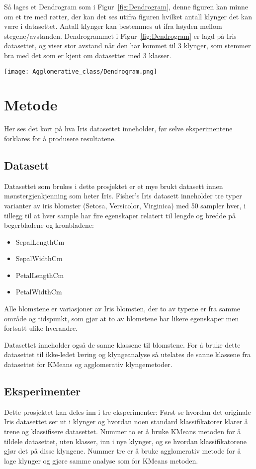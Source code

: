 \documentclass[twocolumn,norwegian]{article}
\begin{document}
	Så lages et Dendrogram som i Figur~\ref{fig:Dendrogram}, denne figuren kan minne om et tre med røtter, der kan det ses utifra figuren hvilket antall klynger det kan være i datasettet. Antall klynger kan bestemmes ut ifra høyden mellom stegene/avstanden. Dendrogrammet i Figur~\ref{fig:Dendrogram} er lagd på Iris datasettet, og viser stor avstand når den har kommet til 3 klynger, som stemmer bra med det som er kjent om datasettet med 3 klasser.
	\begin{figure*}[t!]
		\centering
		\texttt{[image: Agglomerative\_class/Dendrogram.png]}
		\caption{Dendrogam lagd på Iris datasettet for å finne optimalt antall klynger.}
		\label{fig:Dendrogram}
	\end{figure*}
	
	
	\section{Metode}
	Her ses det kort på hva Iris datasettet inneholder, før selve eksperimentene forklares for å produsere resultatene.
	
	\subsection{Datasett}
	Datasettet som brukes i dette prosjektet er et mye brukt datasett innen mønstergjenkjenning som heter Iris. Fisher's Iris datasett inneholder tre typer varianter av iris blomster (Setosa, Versicolor, Virginica) med 50 sampler hver, i tillegg til at hver sample har fire egenskaper relatert til lengde og bredde på begerbladene og kronbladene:
	\begin{itemize}
		\item SepalLengthCm
		\item SepalWidthCm
		\item PetalLengthCm
		\item PetalWidthCm
	\end{itemize}
	Alle blomstene er variasjoner av Iris blomsten, der to av typene er fra samme område og tidspunkt, som gjør at to av blomstene har likere egenskaper men fortsatt ulike hverandre.

	Datasettet inneholder også de sanne klassene til blomstene. For å bruke dette datasettet til ikke-ledet læring og klyngeanalyse så utelates de sanne klassene fra datasettet for KMeans og agglomerativ klyngemetoder.
	
	
	\subsection{Eksperimenter}
	Dette prosjektet kan deles inn i tre eksperimenter: Først se hvordan det originale Iris datasettet ser ut i klynger og hvordan noen standard klassifikatorer klarer å trene og klassifisere datasettet. Nummer to er å bruke KMeans metoden for å tildele datasettet, uten klasser, inn i nye klynger, og se hvordan klassifikatorene gjør det på disse klyngene. Nummer tre er å bruke agglomerativ metode for å lage klynger og gjøre samme analyse som for KMeans metoden.
	
\end{document}
